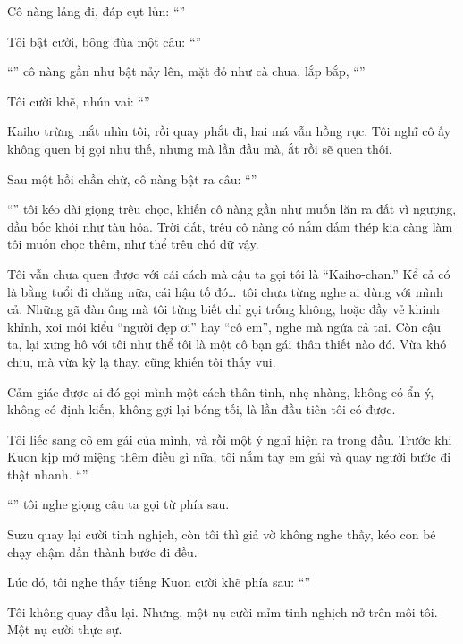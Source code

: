 \documentclass[../main.tex]{subfiles}
\begin{document}
Cô nàng lảng đi, đáp cụt lủn: ``''

Tôi bật cười, bông đùa một câu: ``''

``'' cô nàng gần như bật nảy lên, mặt đỏ như cà chua, lắp bắp, ``''

Tôi cười khẽ, nhún vai: ``''

Kaiho trừng mắt nhìn tôi, rồi quay phắt đi, hai má vẫn hồng rực. Tôi nghĩ cô ấy không quen bị gọi như thế, nhưng mà lần đầu mà, ắt rồi sẽ quen thôi.

Sau một hồi chần chừ, cô nàng bật ra câu: ``''

``'' tôi kéo dài giọng trêu chọc, khiến cô nàng gần như muốn lăn ra đất vì ngượng, đầu bốc khói như tàu hỏa. Trời đất, trêu cô nàng có nắm đấm thép kia càng làm tôi muốn chọc thêm, như thể trêu chó dữ vậy.


Tôi vẫn chưa quen được với cái cách mà cậu ta gọi tôi là ``Kaiho-chan.'' Kể cả có là bằng tuổi đi chăng nữa, cái hậu tố đó\dots\ tôi chưa từng nghe ai dùng với mình cả. Những gã đàn ông mà tôi từng biết chỉ gọi trống không, hoặc đầy vẻ khinh khỉnh, xoi mói kiểu ``người đẹp ơi'' hay ``cô em'', nghe mà ngứa cả tai. Còn cậu ta, lại xưng hô với tôi như thể tôi là một cô bạn gái thân thiết nào đó. Vừa khó chịu, mà vừa kỳ lạ thay, cũng khiến tôi thấy vui.

Cảm giác được ai đó gọi mình một cách thân tình, nhẹ nhàng, không có ẩn ý, không có định kiến, không gợi lại bóng tối, là lần đầu tiên tôi có được.

Tôi liếc sang cô em gái của mình, và rồi một ý nghĩ hiện ra trong đầu. Trước khi Kuon kịp mở miệng thêm điều gì nữa, tôi nắm tay em gái và quay người bước đi thật nhanh. ``''

``'' tôi nghe giọng cậu ta gọi từ phía sau.

Suzu quay lại cười tinh nghịch, còn tôi thì giả vờ không nghe thấy, kéo con bé chạy chậm dần thành bước đi đều.

Lúc đó, tôi nghe thấy tiếng Kuon cười khẽ phía sau: ``''

Tôi không quay đầu lại. Nhưng, một nụ cười mỉm tinh nghịch nở trên môi tôi. Một nụ cười thực sự.
\end{document}

